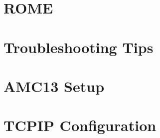 %

\chapter{ROME}



\chapter{Troubleshooting Tips}



\appendix


%

\chapter{AMC13 Setup}



\chapter{TCPIP Configuration}




